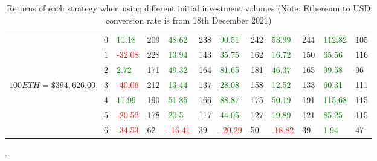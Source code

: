 \begin{table}[htb!]
\begin{adjustwidth}{-0.9in}{-0.9in}
\begin{tabular}{|p{5em}|p{2em}|p{3em}|p{3em}|p{3em}|p{3em}|p{3em}|p{3em}|p{3em}|p{3em}|p{3em}|p{3em}|}
            & 0 & \textcolor{green}{11.18} & 209 & \textcolor{green}{48.62} & 238 & \textcolor{green}{90.51} & 242 & \textcolor{green}{53.99} & 244 & \textcolor{green}{112.82} & 105\\\cline{3-12}
            & 1 & \textcolor{red}{-32.08} & 228 & \textcolor{green}{13.94} & 143 & \textcolor{green}{35.75} & 162 & \textcolor{green}{16.72} & 150 & \textcolor{green}{65.56} & 116\\\cline{3-12}
            & 2 & \textcolor{green}{2.72} & 171 & \textcolor{green}{49.32} & 164 & \textcolor{green}{81.65} & 181 & \textcolor{green}{46.37} & 165 & \textcolor{green}{99.58} & 96\\\cline{3-12}
            $100 ETH = \$394,626.00$ & 3 & \textcolor{red}{-40.06} & 212 & \textcolor{green}{13.44} & 137 & \textcolor{green}{28.08} & 158 & \textcolor{green}{12.52} & 133 & \textcolor{green}{60.31} & 111\\[-3ex]\cline{3-12}
            & 4 & \textcolor{green}{11.99} & 190 & \textcolor{green}{51.85} & 166 & \textcolor{green}{88.87} & 175 & \textcolor{green}{50.19} & 191 & \textcolor{green}{115.68} & 115\\\cline{3-12}
            & 5 & \textcolor{red}{-20.52} & 178 & \textcolor{green}{20.5} & 117 & \textcolor{green}{44.05} & 127 & \textcolor{green}{19.89} & 121 & \textcolor{green}{85.25} & 115\\\cline{3-12}
            & 6 & \textcolor{red}{-34.53} & 62 & \textcolor{red}{-16.41} & 39 & \textcolor{red}{-20.29} & 50 & \textcolor{red}{-18.82} & 39 & \textcolor{green}{1.94} & 47\\\hline
        \end{tabular}
    \end{adjustwidth}
    \caption{Returns of each strategy when using different initial investment volumes (Note: Ethereum to USD conversion rate is from 18th December 2021) \label{tab:VaryInitialInvestments}}.
\end{table}

